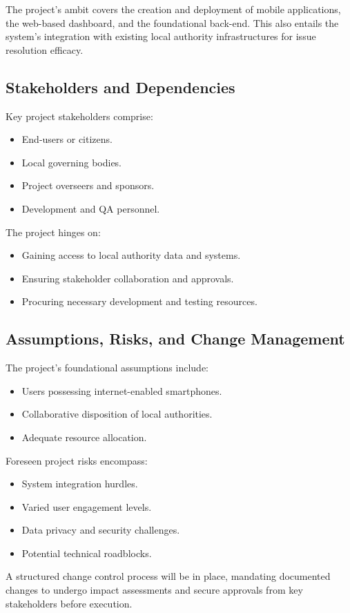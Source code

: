     The project's ambit covers the creation and deployment of mobile applications, the \gls{web-based} dashboard, and the foundational back-end. This also entails the system's integration with existing local authority infrastructures for issue resolution efficacy.
    
\subsection{Stakeholders and Dependencies}
    Key project \gls{stakeholders} comprise:
    \begin{itemize}
        \item End-users or citizens.
        \item Local governing bodies.
        \item Project overseers and sponsors.
        \item Development and \gls{QA} personnel.
    \end{itemize}
    
    The project hinges on:
    \begin{itemize}
        \item Gaining access to local authority data and systems.
        \item Ensuring stakeholder collaboration and approvals.
        \item Procuring necessary development and testing resources.
    \end{itemize}

\subsection{Assumptions, Risks, and Change Management}
    The project's foundational assumptions include:
    \begin{itemize}
        \item Users possessing internet-enabled smartphones.
        \item Collaborative disposition of local authorities.
        \item Adequate resource allocation.
    \end{itemize}

    Foreseen project risks encompass:
    \begin{itemize}
        \item System integration hurdles.
        \item Varied user engagement levels.
        \item Data privacy and security challenges.
        \item Potential technical roadblocks.
    \end{itemize}
    
    A structured change control process will be in place, mandating documented changes to undergo impact assessments and secure approvals from key \gls{stakeholders} before execution.
